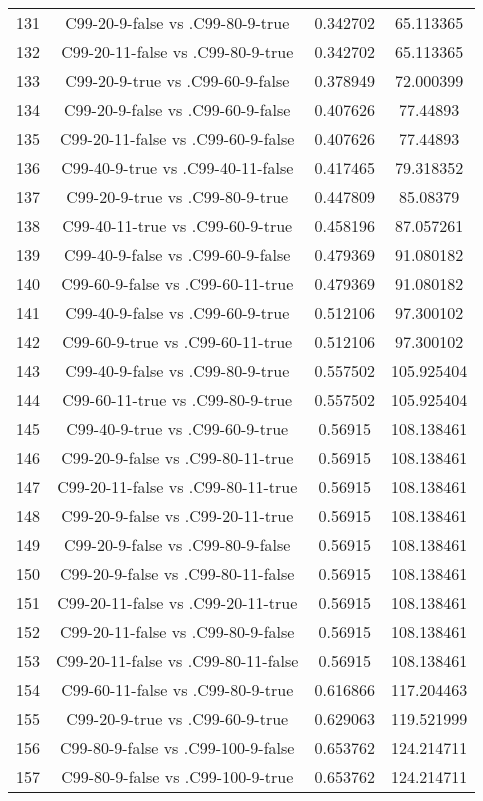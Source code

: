 \documentclass[a4paper,10pt]{article}
\begin{document}
\begin{landscape}
\begin{table}[!htp]
\begin{tabular}{cccc}
131&C99-20-9-false vs .C99-80-9-true&0.342702&65.113365\\
132&C99-20-11-false vs .C99-80-9-true&0.342702&65.113365\\
133&C99-20-9-true vs .C99-60-9-false&0.378949&72.000399\\
134&C99-20-9-false vs .C99-60-9-false&0.407626&77.44893\\
135&C99-20-11-false vs .C99-60-9-false&0.407626&77.44893\\
136&C99-40-9-true vs .C99-40-11-false&0.417465&79.318352\\
137&C99-20-9-true vs .C99-80-9-true&0.447809&85.08379\\
138&C99-40-11-true vs .C99-60-9-true&0.458196&87.057261\\
139&C99-40-9-false vs .C99-60-9-false&0.479369&91.080182\\
140&C99-60-9-false vs .C99-60-11-true&0.479369&91.080182\\
141&C99-40-9-false vs .C99-60-9-true&0.512106&97.300102\\
142&C99-60-9-true vs .C99-60-11-true&0.512106&97.300102\\
143&C99-40-9-false vs .C99-80-9-true&0.557502&105.925404\\
144&C99-60-11-true vs .C99-80-9-true&0.557502&105.925404\\
145&C99-40-9-true vs .C99-60-9-true&0.56915&108.138461\\
146&C99-20-9-false vs .C99-80-11-true&0.56915&108.138461\\
147&C99-20-11-false vs .C99-80-11-true&0.56915&108.138461\\
148&C99-20-9-false vs .C99-20-11-true&0.56915&108.138461\\
149&C99-20-9-false vs .C99-80-9-false&0.56915&108.138461\\
150&C99-20-9-false vs .C99-80-11-false&0.56915&108.138461\\
151&C99-20-11-false vs .C99-20-11-true&0.56915&108.138461\\
152&C99-20-11-false vs .C99-80-9-false&0.56915&108.138461\\
153&C99-20-11-false vs .C99-80-11-false&0.56915&108.138461\\
154&C99-60-11-false vs .C99-80-9-true&0.616866&117.204463\\
155&C99-20-9-true vs .C99-60-9-true&0.629063&119.521999\\
156&C99-80-9-false vs .C99-100-9-false&0.653762&124.214711\\
157&C99-80-9-false vs .C99-100-9-true&0.653762&124.214711\\

\end{tabular}
\end{table}
\end{landscape}
\end{document}
